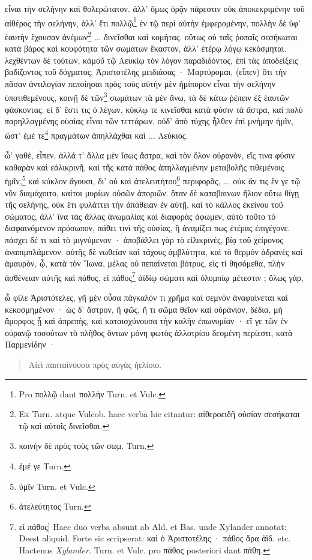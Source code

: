 \documentclass[a4paper, 11pt, oneside, polutonikogreek, german]{article}
\begin{document}
εἶναι τὴν σελήνην καὶ θολερώτατον. ἀλλ' ὅμως ὁρᾷν πάρεστιν οὐκ ἀποκεκριμένην τοῦ αἰθέρος τὴν σελήνην, ἀλλ' ἔτι πολλῷ\footnote{Pro πολλῷ dant πολλὴν Turn. et Vulc.} ἐν τῷ περὶ αὐτὴν ἐμφερομένην, πολλὴν δὲ ὑφ' ἑαυτὴν ἔχουσαν ἀνέμων\footnote{Ex Turn. atque Vulcob. haec verba hic citantur: αἰθεροειδῆ οὐσίαν σεσήκαται τῷ καὶ αὐτοῖς δινεῖσθαι.} ... δινεῖσθαι καὶ κομήτας. οὕτως οὐ ταῖς ῥοπαῖς σεσήκωται κατὰ βάρος καὶ κουφότητα τῶν σωμάτων ἕκαστον, ἀλλ' ἑτέρῳ λόγῳ κεκόσμηται. λεχθέντων δὲ τούτων, κἀμοῦ τῷ Λευκίῳ τὸν λόγον παραδιδόντος, ἐπὶ τὰς ἀποδείξεις βαδίζοντος τοῦ δόγματος, Ἀριστοτέλης μειδιάσας · Μαρτύρομαι, (εἶπεν) ὅτι τὴν πᾶσαν ἀντιλογίαν πεποίησαι πρὸς τοὺς αὐτὴν μὲν ἡμίπυρον εἶναι τὴν σελήνην ὑποτιθεμένους, κοινῇ δὲ τῶν\footnote{κοινὴν δὲ πρὸς τοὺς τῶν σωμ. Turn.} σωμάτων τὰ μὲν ἄνω, τὰ δὲ κάτω ῥέπειν ἐξ ἑαυτῶν φάσκοντας. εἰ δ' ἔστι τις ὁ λέγων, κύκλῳ τε κινεῖσθαι κατὰ φύσιν τὰ ἄστρα, καὶ πολὺ παρηλλαγμένης οὐσίας εἶναι τῶν τεττάρων, οὐδ' ἀπὸ τύχης ἦλθεν ἐπὶ μνήμην ἡμῖν, ὥστ' ἐμέ τε\footnote{ἐμέ γε Turn.} πραγμάτων ἀπηλλάχθαι καὶ ... Λεύκιος.

ὦ' γαθὲ, εἶπεν, ἀλλά τ' ἄλλα μὲν ἴσως ἄστρα, καὶ τὸν ὅλον οὐρανὸν, εἴς τινα φύσιν καθαρὰν καὶ εἀλικρινῆ, καὶ τῆς κατὰ πάθος ἀπηλλαγμένην μεταβολῆς τιθεμένοις ἡμῖν,\footnote{ὑμῖν Turn. et Vulc.} καὶ κύκλον ἄγουσι, δι' οὐ καὶ ἀτελευτήτου\footnote{ἀτελεύτητος Turn.} περιφορᾶς, ... οὐκ ἄν τις ἔν γε τῷ νῦν διαμάχοιτο, καίτοι μυρίων οὐσῶν ἀποριῶν. ὅταν δὲ καταβαινων ἥλιον οὕτω θίγῃ τῆς σελήνης, οὐκ ἔτι φυλάττει τὴν ἀπάθειαν ἐν αὐτῇ, καὶ τὸ κάλλος ἐκείνου τοῦ σώματος, ἀλλ' ἵνα τὰς ἄλλας ἀνωμαλίας καὶ διαφορὰς ἀφωμεν, αὐτὸ τοῦτο τὸ διαφαινόμενον πρόσωπον, πάθει τινὶ τῆς οὐσίας, ἢ ἀναμίξει πως ἑτέρας ἐπιγέγονε. πάσχει δέ τι καὶ τὸ μιγνύμενον · ἀποβάλλει γὰρ τὸ εἰλικρινὲς, βίᾳ τοῦ χείρονος ἀναπιμπλάμενον. αὐτῆς δὲ νωθείαν καὶ τάχους ἀμβλύτητα, καὶ τὸ θερμὸν ἀδρανὲς καὶ ἀμαυρὸν, ᾧ, κατὰ τὸν Ἴωνα, μέλας οὐ πεπαίνεται βότρυς, εἰς τί θησόμεθα, πλὴν ἀσθένειαν αὐτῆς καὶ πάθος, εἰ πάθος\footnote{εἰ πάθος] Haec duo verba absunt ab Ald. et Bas. unde Xylander annotat: Deest aliquid. Forte sic scripserat: καὶ ὁ Ἀριστοτέλης · πάθος ἄρα ἀϊδ. etc. Hactenus \emph{Xylander.} Turn. et Vulc. pro πάθος posteriori dant πάθη.} ἀϊδίῳ σώματι καὶ ὀλυμπίῳ μέτεστιν ; ὅλως γὰρ,

ὦ φίλε Ἀριστότελες, γῆ μὲν οὖσα πάγκαλόν τι χρῆμα καὶ σεμνὸν ἀναφαίνεται καὶ κεκοσμημένον · ὡς δ' ἄστρον, ἢ φῶς, ἢ τι σῶμα θεῖον καὶ οὐράνιον, δέδια, μὴ ἄμορφος ᾖ καὶ ἀπρεπὴς, καὶ καταισχύνουσα τὴν καλὴν ἐπωνυμίαν · εἴ γε τῶν ἐν οὐρανῷ τοσούτων τὸ πλῆθος ὄντων μόνη φωτὸς ἀλλοτρίου δεομένη περίεστι, κατὰ Παρμενίδην ·
\begin{quotation}
Αἰεὶ παπταίνουσα πρὸς αὐγὰς ἠελίοιο.
\end{quotation}
\end{document}
